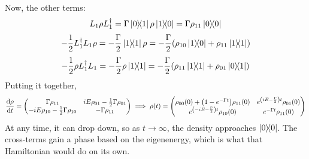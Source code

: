\begin{example}
\begin{align*}
    \end{align*}
    Now, the other terms:
    \[ L_1 \rho L_1^{\dagger} = \Gamma \ketbra{0}{1} \rho \ketbra{1}{0} = \Gamma \rho_{11} \ketbra{0}{0} \]
    \[ -\frac{1}{2} L_1^{\dagger} L_1 \rho = -\frac{\Gamma}{2} \ketbra{1}{1} \rho = -\frac{\Gamma}{2} \qty(\rho_{10} \ketbra{1}{0} + \rho_{11} \ketbra{1}{1}) \]
    \[ -\frac{1}{2} \rho L_1^{\dagger} L_1 = -\frac{\Gamma}{2} \rho \ketbra{1}{1} = -\frac{\Gamma}{2} \qty(\rho_{11} \ketbra{1} + \rho_{01} \ketbra{0}{1})\]
    Putting it together,
    \[ \dv{\rho}{t} = \begin{pmatrix}
        \Gamma \rho_{11} & iE\rho_{01} - \frac{1}{2} \Gamma \rho_{01} \\
        -iE \rho_{10} - \frac{1}{2} \Gamma \rho_{10} & - \Gamma \rho_{11}
    \end{pmatrix} \implies \rho(t) = \begin{pmatrix}
        \rho_{00}(0) + \qty(1 - e^{-\Gamma t})\rho_{11}(0) & e^{\qty(iE - \frac{\Gamma}{2})t }\rho_{01} (0) \\
        e^{\qty(-iE - \frac{\Gamma}{2})t }\rho_{10} (0) &  e^{- \Gamma t} \rho_{11}(0)\\
    \end{pmatrix} \]
    At any time, it can drop down, so as $t \to \infty$, the density approaches $\ketbra{0}$. The cross-terms gain a phase based on the eigenenergy,
    which is what that Hamiltonian would do on its own.
\end{example}